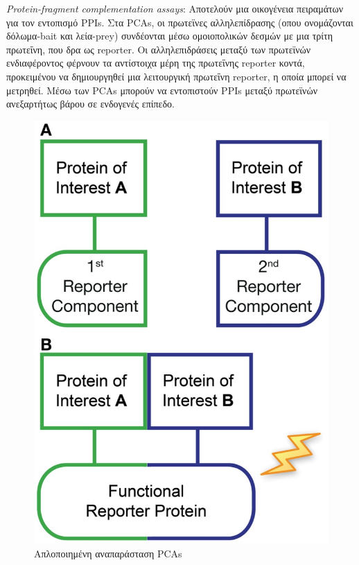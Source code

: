 \textit{Protein-fragment complementation assays}: Aποτελούν μια οικογένεια πειραμάτων για τον εντοπισμό PPIs. Στα PCAs, οι πρωτεϊνες αλληλεπίδρασης (οπου ονομάζονται δόλωμα-bait και λεία-prey) συνδέονται μέσω ομοιοπολικών δεσμών με μια τρίτη πρωτεΐνη, που δρα ως reporter. Οι αλληλεπιδράσεις μεταξύ των πρωτεϊνών ενδιαφέροντος φέρνουν τα αντίστοιχα μέρη της πρωτεΐνης reporter κοντά, προκειμένου να δημιουργηθεί μια λειτουργική πρωτεΐνη reporter, η οποία μπορεί να μετρηθεί. Μέσω των PCAs μπορούν να εντοπιστούν PPIs μεταξύ πρωτεϊνών ανεξαρτήτως βάρου σε ενδογενές επίπεδο\cite{Michnick2011}.

\begin{figure}[h]
  \centering
  \includegraphics[scale=0.20]{images/PCA.png}
  \caption{Απλοποιημένη αναπαράσταση PCAs}
  \label{fig:PCA}
\end{figure}

